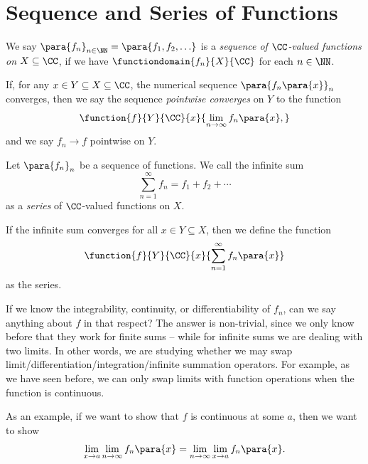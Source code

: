 \section{Sequence and Series of Functions}

\begin{definition}
    \label{def:seq-of-fn}%
    We say \(\para{f_n}_{n \in \NN} = \para{f_1, f_2, \ldots}\) is a \emph{sequence of \(\CC\)-valued functions on \(X \subseteq \CC\)}, if we have \(\functiondomain{f_n}{X}{\CC}\) for each \(n \in \NN\).
\end{definition}

\begin{definition}
    \label{def:pointwise-convergence}%
    If, for any \(x \in Y \subseteq X \subseteq \CC\), the numerical sequence \(\para{f_n \para{x}}_{n}\) converges, then we say the sequence \emph{pointwise converges} on \(Y\) to the function
    \[
        \function{f}{Y}{\CC}{x}{\lim_{n \to \infty} f_n \para{x},}
    \]
    and we say \(f_n \to f\) pointwise on \(Y\).
\end{definition}

\begin{definition}
    \label{def:series-of-functions}%
    Let \(\para{f_n}_{n}\) be a sequence of functions. We call the infinite sum
    \[
        \sum_{n = 1}^{\infty} f_n = f_1 + f_2 + \cdots
    \]
    as a \emph{series} of \(\CC\)-valued functions on \(X\).

    If the infinite sum converges for all \(x \in Y \subseteq X\), then we define the function
    \[
        \function{f}{Y}{\CC}{x}{\sum_{n = 1}^{\infty} f_n \para{x}}
    \]
    as the series.
\end{definition}

If we know the integrability, continuity, or differentiability of \(f_n\), can we say anything about \(f\) in that respect? The answer is non-trivial, since we only know before that they work for finite sums -- while for infinite sums we are dealing with two limits. In other words, we are studying whether we may swap limit/differentiation/integration/infinite summation operators. For example, as we have seen before, we can only swap limits with function operations when the function is continuous.

As an example, if we want to show that \(f\) is continuous at some \(a\), then we want to show
\[
    \lim_{x \to a} \lim_{n \to \infty} f_n \para{x} = \lim_{n \to \infty} \lim_{x \to a} f_n \para{x}.
\]

